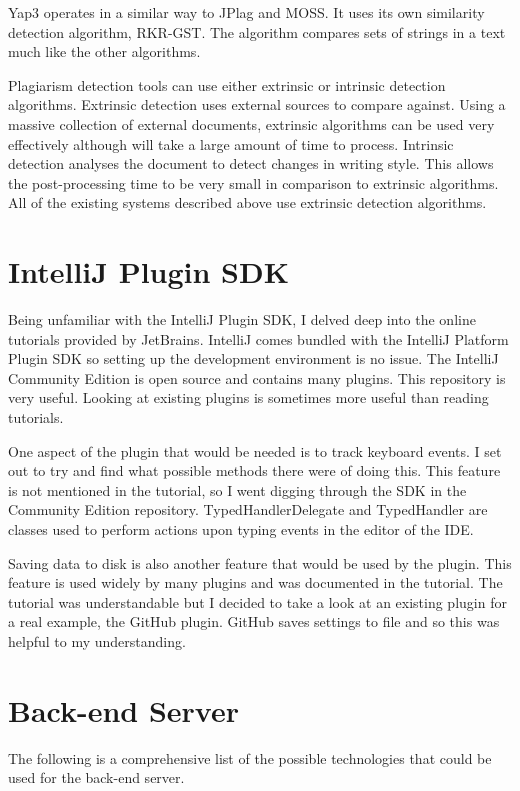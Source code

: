 Yap3 operates in a similar way to JPlag and MOSS. It uses its own similarity detection algorithm, RKR-GST. The algorithm compares sets of strings in a text much like the other algorithms\cite{Wise1996}.

Plagiarism detection tools can use either extrinsic or intrinsic detection algorithms. Extrinsic detection uses external sources to compare against. Using a massive collection of external documents, extrinsic algorithms can be used very effectively although will take a large amount of time to process. Intrinsic detection analyses the document to detect changes in writing style. This allows the post-processing time to be very small in comparison to extrinsic algorithms. All of the existing systems described above use extrinsic detection algorithms.

\section{IntelliJ Plugin SDK}
Being unfamiliar with the IntelliJ Plugin SDK, I delved deep into the online tutorials provided by JetBrains\cite{IntelliJGettingStarted}. IntelliJ comes bundled with the IntelliJ Platform Plugin SDK so setting up the development environment is no issue. The IntelliJ Community Edition is open source and contains many plugins\cite{IntelliJGitHub}. This repository is very useful. Looking at existing plugins is sometimes more useful than reading tutorials.

One aspect of the plugin that would be needed is to track keyboard events. I set out to try and find what possible methods there were of doing this. This feature is not mentioned in the tutorial, so I went digging through the SDK in the Community Edition repository. TypedHandlerDelegate and TypedHandler are classes used to perform actions upon typing events in the editor of the IDE.

Saving data to disk is also another feature that would be used by the plugin. This feature is used widely by many plugins and was documented in the tutorial. The tutorial was understandable but I decided to take a look at an existing plugin for a real example, the GitHub plugin. GitHub saves settings to file and so this was helpful to my understanding.

\section{Back-end Server}
The following is a comprehensive list of the possible technologies that could be used for the back-end server.

